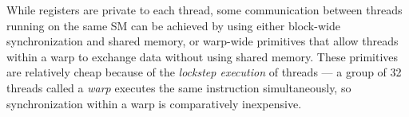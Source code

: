 



While registers are private to each thread, some communication between threads running on the same SM can be achieved by using either block-wide synchronization and shared memory, or warp-wide primitives that allow threads within a warp to exchange data without using shared memory. These primitives are relatively cheap because of the \emph{lockstep execution} of threads --- a group of 32 threads called a \emph{warp} executes the same instruction simultaneously, so synchronization within a warp is comparatively inexpensive.




